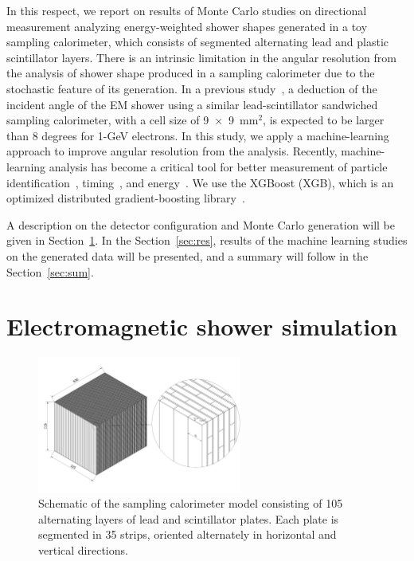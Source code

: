 \documentclass[12pt,times,draftclsnofoot,a4paper]{elsarticle}
\begin{document}
In this respect, we report on results of Monte Carlo studies on directional measurement analyzing energy-weighted shower shapes generated in a toy sampling calorimeter, which consists of segmented alternating lead and plastic scintillator layers. There is an intrinsic limitation in the angular resolution from the analysis of shower shape produced in a sampling calorimeter due to the stochastic feature of its generation. In a previous study~\cite{PbScint}, a deduction of the incident angle of the EM shower using a similar lead-scintillator sandwiched sampling calorimeter, with a cell size of 9~$\times$~9~mm$^{2}$, is expected to be larger than 8 degrees for 1-GeV electrons. In this study, we apply a machine-learning approach to improve angular resolution from the analysis. Recently, machine-learning analysis has become a critical tool for better measurement of particle identification~\cite{mlp}, timing~\cite{mlt}, and energy~\cite{mle}. We use the XGBoost (XGB), which is an optimized distributed gradient-boosting library~\cite{xgboost:2016}.

A description on the detector configuration and Monte Carlo generation will be given in Section~\ref{sec:ems}. In the Section~\ref{sec:res}, results of the machine learning studies on the generated data will be presented, and a summary will follow in the Section~\ref{sec:sum}. 

\section{Electromagnetic shower simulation}
\label{sec:ems}

\begin{figure}[!hbt]
\centering
\includegraphics[width=0.6\textwidth]{Fig1_detector_schematic.jpeg}
\caption{ Schematic of the sampling calorimeter model consisting of 105 alternating layers of lead and scintillator plates. Each plate is segmented in 35 strips, oriented alternately in horizontal and vertical directions. }
\label{fig:det_conf}
\end{figure}
\end{document}
